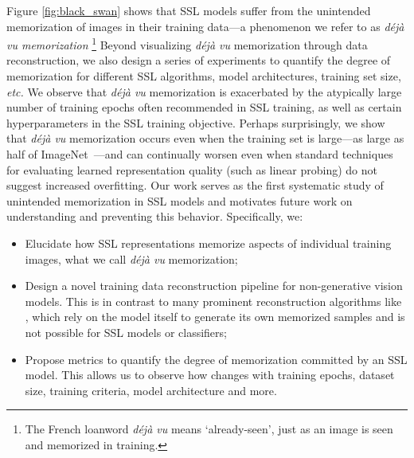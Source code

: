 Figure \ref{fig:black_swan} shows that SSL models suffer from the unintended memorization of images in their training data---a phenomenon we refer to as \emph{déjà vu memorization}
\footnote{The French loanword \emph{déjà vu} means `already-seen', just as an image is seen and memorized in training.}
Beyond visualizing \emph{déjà vu} memorization through data reconstruction, we also design a series of experiments to quantify the degree of memorization for different SSL algorithms, model architectures, training set size, \emph{etc.} We observe that \emph{déjà vu} memorization is exacerbated by the atypically large number of training epochs often recommended in SSL training, as well as certain hyperparameters in the SSL training objective. Perhaps surprisingly, we show that \emph{déjà vu} memorization occurs even when the training set is large---as large as half of ImageNet~\citep{imagenet}---and can continually worsen even when standard techniques for evaluating learned representation quality (such as linear probing) do not suggest increased overfitting. Our work serves as the first systematic study of unintended memorization in SSL models and motivates future work on understanding and preventing this behavior. Specifically, we: 
\begin{itemize}
    \vspace{-0.5em}
    \item Elucidate how SSL representations memorize aspects of individual training images, what we call \emph{déjà vu} memorization;
    \item Design a novel training data reconstruction pipeline for non-generative vision models. This is in contrast to many prominent reconstruction algorithms like \citep{carlini2021extracting, google_diffusion}, which rely on the model itself to generate its own memorized samples and is not possible for SSL models or classifiers;
    \item Propose metrics to quantify the degree of \dejavu memorization committed by an SSL model. This allows us to observe how \dejavu changes with training epochs, dataset size, training criteria, model architecture and more. 
\end{itemize}
